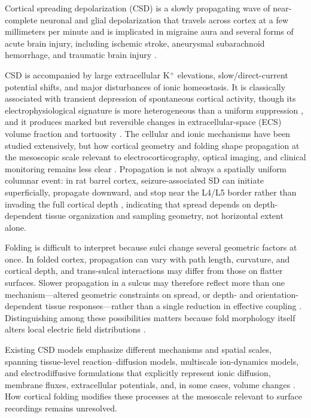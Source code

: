\documentclass[12pt]{article}
\begin{document}
Cortical spreading depolarization (CSD) is a slowly propagating wave of near-complete neuronal and glial depolarization that travels across cortex at a few millimeters per minute and is implicated in migraine aura and several forms of acute brain injury, including ischemic stroke, aneurysmal subarachnoid hemorrhage, and traumatic brain injury \citep{Harriott2025,Andrew2022,Mehra2023,vanHameren2024,Dahlem_2004}.

CSD is accompanied by large extracellular K$^+$ elevations, slow/direct-current potential shifts, and major disturbances of ionic homeostasis. It is classically associated with transient depression of spontaneous cortical activity, though its electrophysiological signature is more heterogeneous than a uniform suppression \citep{Andrew2022,Nasretdinov2023}, and it produces marked but reversible changes in extracellular-space (ECS) volume fraction and tortuosity \citep{Tonnesen2022,Sykova2008,Mazel2002ECS}. The cellular and ionic mechanisms have been studied extensively, but how cortical geometry and folding shape propagation at the mesoscopic scale relevant to electrocorticography, optical imaging, and clinical monitoring remains less clear \citep{Andrew2022,PalopoliTrojani2024,SanchezPorras2024,Zhang2026}. Propagation is not always a spatially uniform columnar event: in rat barrel cortex, seizure-associated SD can initiate superficially, propagate downward, and stop near the L4/L5 border rather than invading the full cortical depth \citep{Zakharov2019}, indicating that spread depends on depth-dependent tissue organization and sampling geometry, not horizontal extent alone.

Folding is difficult to interpret because sulci change several geometric factors at once. In folded cortex, propagation can vary with path length, curvature, and cortical depth, and trans-sulcal interactions may differ from those on flatter surfaces. Slower propagation in a sulcus may therefore reflect more than one mechanism---altered geometric constraints on spread, or depth- and orientation-dependent tissue responses---rather than a single reduction in effective coupling \citep{Andrew2022,SanchezPorras2024}. Distinguishing among these possibilities matters because fold morphology itself alters local electric field distributions \citep{Royer2026,Nasretdinov2023,PalopoliTrojani2024,Wang2025}.

Existing CSD models emphasize different mechanisms and spatial scales, spanning tissue-level reaction--diffusion models, multiscale ion-dynamics models, and electrodiffusive formulations that explicitly represent ionic diffusion, membrane fluxes, extracellular potentials, and, in some cases, volume changes \citep{Dahlem_2004,Kelley2022,Saetra2024}. How cortical folding modifies these processes at the mesoscale relevant to surface recordings remains unresolved.
\end{document}
